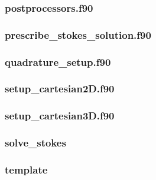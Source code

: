  \subsubsection{postprocessors.f90}

 \subsubsection{prescribe\_stokes\_solution.f90}

 \subsubsection{quadrature\_setup.f90}

 \subsubsection{setup\_cartesian2D.f90}
 
 \subsubsection{setup\_cartesian3D.f90}
 
 \subsubsection{solve\_stokes}

 \subsubsection{template}

